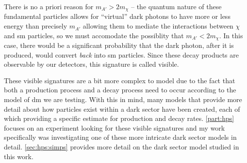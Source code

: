 There is no a priori reason for $m_{A'} > 2 m_\chi$ -- the quantum nature of these fundamental
particles allows for ``virtual'' dark photons to have more or less energy than precisely $m_{A'}$
allowing them to mediate the interactions between $\chi$ and \ac{sm} particles, so we must
accomodate the possiblity that $m_{A'} < 2 m_\chi$. In this case, there would be a significant
probability that the dark photon, after it is produced, would convert \emph{back} into \ac{sm}
particles. Since these decay products are observable by our detectors, this signature is called
visible.

These visible signatures are a bit more complex to model due to the fact that both a production
process and a decay process need to occur according to the model of \ac{dm} we are testing. With
this in mind, many models that provide more detail about how particles exist within a dark sector
have been created, each of which providing a specific estimate for production and decay rates.
\cref{part:hps} focuses on an experiment looking for these visible signatures and my work
specifically was investigating one of these more intricate dark sector models in detail.
\cref{sec:hps:simps} provides more detail on the dark sector model studied in this work.
